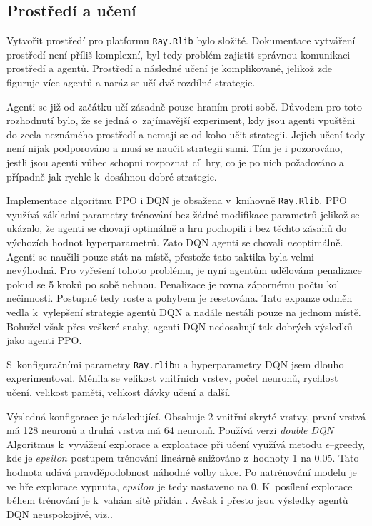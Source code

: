 \subsection{Prostředí a učení}\label{subsec:prostredi}

Vytvořit prostředí pro platformu \texttt{Ray.Rlib} bylo složité.
Dokumentace vytváření prostředí není příliš komplexní, byl tedy problém zajistit správnou komunikaci prostředí a agentů.
Prostředí a následné učení je komplikované, jelikož zde figuruje více agentů a naráz se učí dvě rozdílné strategie.

Agenti se již od začátku učí zásadně pouze hraním proti sobě.
Důvodem pro toto rozhodnutí bylo, že se jedná o~zajímavější experiment, kdy jsou agenti vpuštěni do zcela neznámého prostředí a nemají se od koho učit strategii.
Jejich učení tedy není nijak podporováno a musí se naučit strategii sami.
Tím je i pozorováno, jestli jsou agenti vůbec schopni rozpoznat cíl hry, co je po nich požadováno a případně jak rychle k~dosáhnou dobré strategie.

Implementace algoritmu PPO i DQN je obsažena v~knihovně \texttt{Ray.Rlib}.
PPO využívá základní parametry trénování bez žádné modifikace parametrů jelikož se ukázalo, že agenti se chovají optimálně a hru pochopili i bez těchto zásahů do výchozích hodnot hyperparametrů.
Zato DQN agenti se chovali \emph{ne}optimálně.
Agenti se naučili pouze stát na místě, přestože tato taktika byla velmi nevýhodná.
Pro vyřešení tohoto problému, je nyní agentům udělována penalizace pokud se 5 kroků po sobě nehnou.
Penalizace je rovna zápornému počtu kol nečinnosti.
Postupně tedy roste a pohybem je resetována.
Tato expanze odměn vedla k~vylepšení strategie agentů DQN a nadále nestáli pouze na jednom místě.
Bohužel však přes veškeré snahy, agenti DQN nedosahují tak dobrých výsledků jako agenti PPO\@.

S~konfiguračními parametry \texttt{Ray.rlib}u a hyperparametry DQN jsem dlouho experimentoval.
Měnila se velikost vnitřních vrstev, počet neuronů, rychlost učení, velikost paměti, velikost dávky učení a další.

Výsledná konfigorace je následující.
Obsahuje 2 vnitřní skryté vrstvy, první vrstvá má 128 neuronů a druhá vrstva má 64 neuronů.
Používá verzi \emph{double DQN}
Algoritmus k~vyvážení explorace a exploatace při učení využívá metodu $\epsilon$--greedy, kde je $epsilon$ postupem trénování lineárně snižováno z~hodnoty 1 na 0.05.
Tato hodnota udává pravděpodobnost náhodné volby akce.
Po natrénování modelu je ve hře explorace vypnuta, $epsilon$ je tedy nastaveno na 0.
K~posílení explorace během trénování je k~vahám sítě přidán .
Avšak i přesto jsou výsledky agentů DQN neuspokojivé, viz..

